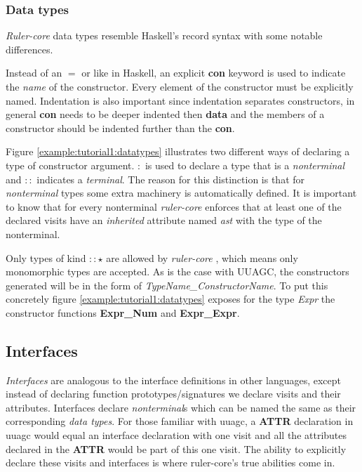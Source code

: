 \documentclass[twoside, titlepage, openright, a4paper]{book}
\newcommand{\rcore}{\emph{ruler-core }}
\newcommand{\Rcore}{\emph{Ruler-core }}
\begin{document}
\subsubsection{Data types}
\Rcore data types resemble Haskell's record syntax with some notable differences.

Instead of an $=$ or \textbar \space like in Haskell, an explicit \textbf{con} keyword is used to indicate the \emph{name} of the constructor. Every element of the constructor must be explicitly named. Indentation is also important since indentation separates constructors, in general \textbf{con} needs to be deeper indented then \textbf{data} and the members of a constructor should be indented further than the \textbf{con}. 

Figure \ref{example:tutorial1:datatypes} illustrates two different ways of declaring a type of constructor argument. $:$ is used to declare a type that is a \emph{nonterminal} and $::$ indicates a \emph{terminal}. The reason for this distinction is that for \emph{nonterminal} types some extra machinery is automatically defined. It is important to know that for every nonterminal \rcore enforces that at least one of the declared visits have an \emph{inherited} attribute named \emph{ast} with the type of the nonterminal.

Only types of kind $:: \star$ are allowed by \rcore, which means only monomorphic types are accepted. As is the case with UUAGC, the constructors generated will be in the form of \emph{TypeName\_ConstructorName}. To put this concretely figure \ref{example:tutorial1:datatypes} exposes for the type \emph{Expr} the constructor functions \textbf{Expr\_Num} and \textbf{Expr\_Expr}.

\subsection{Interfaces}
\emph{Interfaces} are analogous to the interface definitions in other languages, except instead of declaring function prototypes/signatures we declare visits and their attributes. Interfaces declare \emph{nonterminal}s which can be named the same as their corresponding \emph{data types}. For those familiar with uuagc, a \textbf{ATTR} declaration in uuagc would equal an interface declaration with one visit and all the attributes declared in the \textbf{ATTR} would be part of this one visit. The ability to explicitly declare these visits and interfaces is where ruler-core's true abilities come in.
\end{document}
